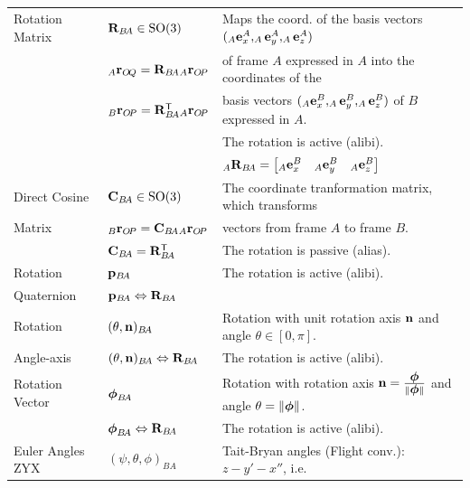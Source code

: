 \documentclass[10pt,landscape,a4paper]{article}
\newcommand\norm[1]{\lVert #1 \rVert}
\newcommand\transpose{\mathsf{T}}
\newcommand\pos[3]{{}_#1\vr_{#2\!#3}}
\newcommand\rotmat[2]{\vR_{#1\!#2}}
\newcommand\comat[2]{\vC_{#1\!#2}}
\newcommand\quat[2]{\vp_{#1\!#2}}
\newcommand\angleaxis[2]{(\theta,\vn)_{#1\!#2}}
\newcommand\rotvec[2]{\vvph_{#1\!#2}}
\begin{document}
\begin{multicols}{2}
\begin{tabular}{|l|l@{}|l@{}|}
\hline
Rotation Matrix &  $\rotmat{B}{A} \in \mathrm{SO}(3)$ & Maps the coord. of the basis vectors $(_A\mathbf e_x^A, _A\mathbf e_y^A, _A\mathbf e_z^A)$ \\
 & $ \pos{A}{O}{Q} = \rotmat{B}{A} \pos{A}{O}{P}$ & of frame $A$ expressed in $A$  into the coordinates of the  \\
& $ \pos{B}{O}{P} = \rotmat{B}{A}^\transpose \pos{A}{O}{P}$ & basis vectors $(_A\mathbf e_x^B, _A\mathbf e_y^B, _A\mathbf e_z^B)$ of $B$ expressed in $A$. \\ 
 & &  The rotation is active (alibi). \\
& & $_A\rotmat{B}{A} = \begin{bmatrix}_A\ve_x^B & _A\ve_y^B & _A\ve_z^B\end{bmatrix}$ \\ \hline
Direct Cosine& $\comat{B}{A} \in \mathrm{SO}(3)$ & The coordinate tranformation matrix, which transforms \\  
 Matrix & $ \pos{B}{O}{P} = \comat{B}{A} \pos{A}{O}{P}$ & vectors from frame $A$ to frame $B$. \\
& $\comat{B}{A} = \rotmat{B}{A}^\transpose$ & The rotation is passive (alias). \\  \hline 
 Rotation  & $\quat{B}{A}$ & The rotation is active (alibi). \\
Quaternion &   $\quat{B}{A} \Leftrightarrow \rotmat{B}{A} $ &  \\ \hline
Rotation & $\angleaxis{B}{A}$ &   Rotation with unit rotation axis $\mathbf n$ and angle $\theta \in [0, \pi]$. \\
Angle-axis & $\angleaxis{B}{A} \Leftrightarrow \rotmat{B}{A}$  & The rotation is active (alibi). \\ \hline
Rotation Vector & $ \rotvec{B}{A} $  &  Rotation with rotation axis $\vn = \frac{\vvph}{\norm{\vvph}}$ and angle $\theta = \norm{\vvph}$. \\ 
 & $\rotvec{B}{A} \Leftrightarrow \rotmat{B}{A} $ &  The rotation is active (alibi). \\ \hline
Euler Angles ZYX &  $(\psi, \theta, \phi)_{B\!A}$  & Tait-Bryan angles (Flight conv.): $z-y'-x''$, i.e.\   \\

\end{tabular}
\end{multicols}
\end{document}
